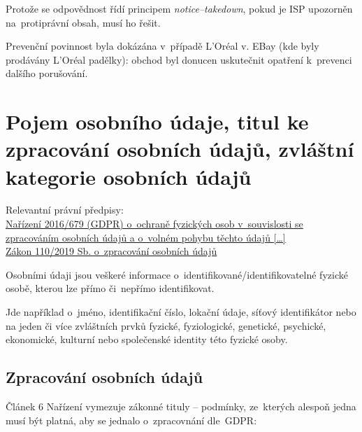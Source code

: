 

Protože se odpovědnost řídí principem \emph{notice--takedown}, pokud je ISP upozorněn na~protiprávní obsah, musí ho řešit.

Prevenční povinnost byla dokázána v~případě L'Oréal v. EBay (kde byly prodávány L'Oréal padělky): obchod byl donucen uskutečnit opatření k~prevenci dalšího porušování.


\clearpage
\section{Pojem osobního údaje, titul ke zpracování osobních údajů, zvláštní kategorie osobních údajů}

{}Relevantní právní předpisy:
\\\href{https://eur-lex.europa.eu/legal-content/CS/ALL/?uri=CELEX:32016R0679
}{Nařízení 2016/679 (GDPR) o~ochraně fyzických osob v~souvislosti se zpracováním osobních údajů a o~volném pohybu těchto údajů [\dots]}
\\\href{https://www.zakonyprolidi.cz/cs/2019-110}{Zákon 110/2019 Sb. o~zpracování osobních údajů}

Osobními údaji jsou veškeré informace o~identifikované/identifikovatelné fyzické osobě, kterou lze přímo či~nepřímo identifikovat.

Jde například o~jméno, identifikační číslo, lokační údaje, síťový identifikátor nebo na jeden či více zvláštních prvků fyzické, fyziologické, genetické, psychické, ekonomické, kulturní nebo společenské identity této fyzické osoby.

\subsection{Zpracování osobních údajů}

Článek 6 Nařízení vymezuje zákonné tituly -- podmínky, ze~kterých alespoň jedna musí být platná, aby se jednalo o~zpracovnání dle~GDPR:

